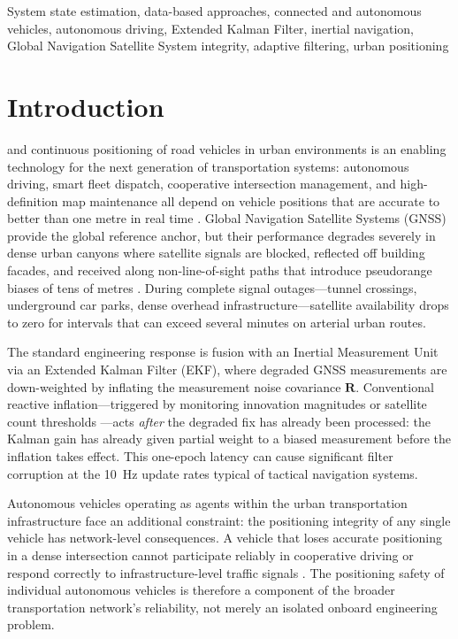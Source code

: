 \documentclass[journal]{IEEEtran}
\newcommand{\Rmat}{\mathbf{R}}
\begin{document}
\begin{IEEEkeywords}
System state estimation, data-based approaches, connected and autonomous
vehicles, autonomous driving, Extended Kalman Filter, inertial navigation,
Global Navigation Satellite System integrity, adaptive filtering, urban
positioning
\end{IEEEkeywords}

\section{Introduction}
 and continuous positioning of road vehicles in urban
environments is an enabling technology for the next generation of
transportation systems: autonomous driving, smart fleet dispatch, cooperative
intersection management, and high-definition map maintenance all depend on
vehicle positions that are accurate to better than one metre in real time
\cite{[AuthorYear_AV_positioning_survey]}.  Global Navigation Satellite
Systems (GNSS) provide the global reference anchor, but their performance
degrades severely in dense urban canyons where satellite signals are blocked,
reflected off building facades, and received along non-line-of-sight paths
that introduce pseudorange biases of tens of metres
\cite{[AuthorYear_NLOS_survey]}.  During complete signal outages---tunnel
crossings, underground car parks, dense overhead infrastructure---satellite
availability drops to zero for intervals that can exceed several minutes on
arterial urban routes.

The standard engineering response is fusion with an Inertial Measurement Unit
via an Extended Kalman Filter (EKF), where degraded GNSS measurements are
down-weighted by inflating the measurement noise covariance $\Rmat$.
Conventional reactive inflation---triggered by monitoring innovation
magnitudes or satellite count thresholds \cite{[AuthorYear_RAIM_classic]}---acts
\textit{after} the degraded fix has already been processed: the Kalman gain
has already given partial weight to a biased measurement before the inflation
takes effect.  This one-epoch latency can cause significant filter corruption
at the 10~Hz update rates typical of tactical navigation systems.

Autonomous vehicles operating as agents within the urban transportation
infrastructure face an additional constraint: the positioning integrity of
any single vehicle has network-level consequences.  A vehicle that loses
accurate positioning in a dense intersection cannot participate reliably in
cooperative driving or respond correctly to infrastructure-level traffic
signals \cite{[AuthorYear_cooperative_driving]}.  The positioning safety of
individual autonomous vehicles is therefore a component of the broader
transportation network's reliability, not merely an isolated onboard
engineering problem.
\end{document}
